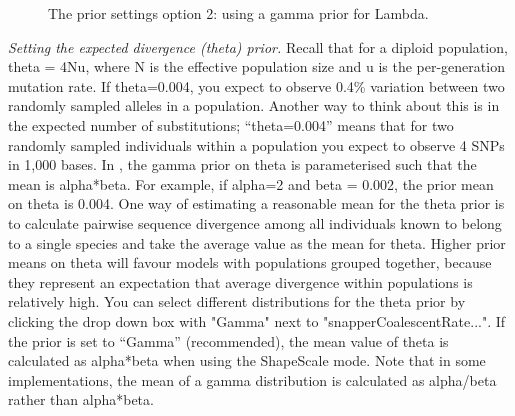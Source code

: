 {    \begin{figure}[htbp]
        \centering
        \caption{The prior settings option 2: using a gamma prior for Lambda.}
        \label{fig:beauti-prior2}
    \end{figure}   
    
    
\textit{Setting the expected divergence (theta) prior.} Recall that for a diploid population, theta = 4Nu, where N is the effective population size and u is the per-generation mutation rate. If theta=0.004, you expect to observe 0.4\% variation between two randomly sampled alleles in a population. Another way to think about this is in the expected number of substitutions; ``theta=0.004'' means that for two randomly sampled individuals within a population you expect to observe 4 SNPs in 1,000 bases. In , the gamma prior on theta is parameterised such that the mean is alpha*beta. For example, if alpha=2 and beta = 0.002, the prior mean on theta is 0.004. One way of estimating a reasonable mean for the theta prior is to calculate pairwise sequence divergence among all individuals known to belong to a single species and take the average value as the mean for theta. Higher prior means on theta will favour models with populations grouped together, because they represent an expectation that average divergence within populations is relatively high. 
You can select different distributions for the theta prior by clicking the drop down box with "Gamma" next to "snapperCoalescentRate...". If the prior is set to ``Gamma'' (recommended), the mean value of theta is calculated as alpha*beta when using the ShapeScale mode.  Note that in some implementations, the mean of a gamma distribution is calculated as alpha/beta rather than alpha*beta. 

    
    }

